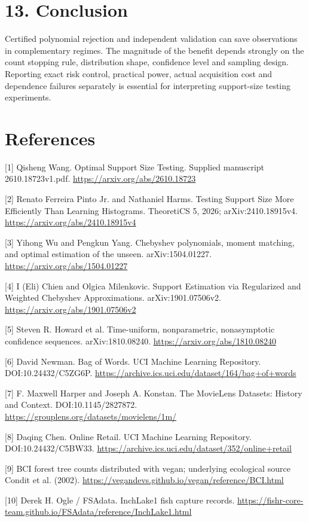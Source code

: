 \documentclass[10pt]{article}
\begin{document}
\section*{13. Conclusion}
Certified polynomial rejection and independent validation can save observations in complementary regimes. The magnitude of the benefit depends strongly on the count stopping rule, distribution shape, confidence level and sampling design. Reporting exact risk control, practical power, actual acquisition cost and dependence failures separately is essential for interpreting support-size testing experiments.

\section*{References}
[1] Qisheng Wang. Optimal Support Size Testing. Supplied manuscript 2610.18723v1.pdf. \url{https://arxiv.org/abs/2610.18723}


[2] Renato Ferreira Pinto Jr. and Nathaniel Harms. Testing Support Size More Efficiently Than Learning Histograms. TheoretiCS 5, 2026; arXiv:2410.18915v4. \url{https://arxiv.org/abs/2410.18915v4}


[3] Yihong Wu and Pengkun Yang. Chebyshev polynomials, moment matching, and optimal estimation of the unseen. arXiv:1504.01227. \url{https://arxiv.org/abs/1504.01227}


[4] I (Eli) Chien and Olgica Milenkovic. Support Estimation via Regularized and Weighted Chebyshev Approximations. arXiv:1901.07506v2. \url{https://arxiv.org/abs/1901.07506v2}


[5] Steven R. Howard et al. Time-uniform, nonparametric, nonasymptotic confidence sequences. arXiv:1810.08240. \url{https://arxiv.org/abs/1810.08240}


[6] David Newman. Bag of Words. UCI Machine Learning Repository. DOI:10.24432/C5ZG6P. \url{https://archive.ics.uci.edu/dataset/164/bag+of+words}


[7] F. Maxwell Harper and Joseph A. Konstan. The MovieLens Datasets: History and Context. DOI:10.1145/2827872. \url{https://grouplens.org/datasets/movielens/1m/}


[8] Daqing Chen. Online Retail. UCI Machine Learning Repository. DOI:10.24432/C5BW33. \url{https://archive.ics.uci.edu/dataset/352/online+retail}


[9] BCI forest tree counts distributed with vegan; underlying ecological source Condit et al. (2002). \url{https://vegandevs.github.io/vegan/reference/BCI.html}


[10] Derek H. Ogle / FSAdata. InchLake1 fish capture records. \url{https://fishr-core-team.github.io/FSAdata/reference/InchLake1.html}
\end{document}
